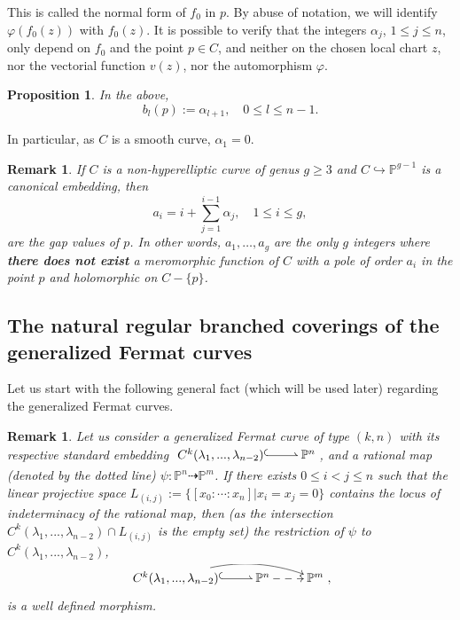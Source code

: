 \documentclass{amsart}
\newcommand{\C}[3]{\ensuremath{C^{#1}(#3_1,...,#3_{#2})}}
\newtheorem{proposition}[theorem]{Proposition}
\newtheorem{remark}[theorem]{Remark}
\begin{document}
This is called the  normal  form of $f_0$ in $p$. By abuse of notation, we will identify  $\varphi(f_0(z))$ with $f_0(z)$. 
It is possible to verify that the integers $\alpha_j$, $1\leq j\leq n$, only depend on $f_0$ and the point $p\in C$, and neither on the chosen local chart $z$, nor the vectorial function $v(z)$,  nor the automorphism $\varphi$.
 

\begin{proposition}\label{pr:ind-ram} 
In the above, 
$$
b_l(p):=\alpha_{l+1}, \quad 0\leq l\leq n-1.
$$
\end{proposition}

In particular, as $C$ is a smooth curve, $\alpha_1=0$.

\begin{remark}
\label{re:gap-W}
If $C$ is a non-hyperelliptic curve of genus  $g \geq 3$ and $C\hookrightarrow  {\mathbb{P}}^{g-1}$ 
is a canonical embedding, then 
$$
a_i=i+\sum_{j=1}^{i-1}\alpha_j, \quad 1\leq i\leq g,
$$
are the gap values of $p$. In other words,  $a_{1},\ldots,a_{g}$ are the only $g$ integers where  {\bf  there does not exist}
 a meromorphic function of  $C$ with a pole of order $a_i$ in the point $p$ and holomorphic on $C-\{p\}$.
\end{remark}

\subsection{The natural regular branched coverings of the generalized Fermat curves}
\label{ss:natural-branched-covering}

Let us start with the following general fact (which will be used later) regarding the generalized Fermat curves. 

\begin{remark}\label{re:rest}
Let us consider a generalized Fermat curve of type $(k,n)$ with its respective standard embedding 
$\xymatrix{\C{k}{n-2}{\lambda} \ar@^{(->}[r] & {\mathbb{P}}^{n} }$, 
and a rational map (denoted by the dotted line)  $\psi: {\mathbb{P}}^{n} \dashrightarrow {\mathbb{P}}^{m}$.
 If there exists 
 $0 \leq i<j\leq n$  such that the linear projective space $L_{(i,j)}:=\{[x_0:\cdots:x_n]|x_i=x_j=0\}$ contains the
locus of indeterminacy of the rational map, then  (as the intersection $\C{k}{n-2}{\lambda}\cap L_{(i,j)}$ is the empty set)
 the restriction of $\psi$  to $\C{k}{n-2}{\lambda}$, $$\xymatrix{ \C{k}{n-2}{\lambda} \ar@^{(->}[r] \ar@/^1pc/[rr]&{\mathbb{P}}^{n}\ar@{-->}[r]&{\mathbb{P}}^m},$$
is a well defined morphism.  
\end{remark}
\end{document}
